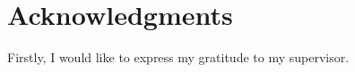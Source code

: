
\section*{Acknowledgments}

Firstly, I would like to express my gratitude to my supervisor.

\vspace{2.5cm}
